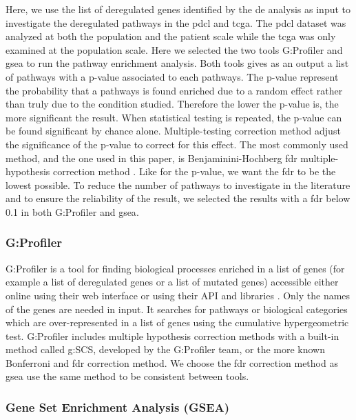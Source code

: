 Here, we use the list of deregulated genes identified by the \acrlong{de} analysis as input to investigate the deregulated pathways in the \acrshort{pdcl} and \acrshort{tcga}.
The \acrlong{pdcl} dataset was analyzed at both the population and the patient scale while the \acrshort{tcga} was only examined at the population scale.
Here we selected the two tools G:Profiler and \acrfull{gsea} to run the pathway enrichment analysis.
Both tools gives as an output a list of pathways with a p-value associated to each pathways.
The p-value represent the probability that a pathways is found enriched due to a random effect rather than truly due to the condition studied.
Therefore the lower the p-value is, the more significant the result.
When statistical testing is repeated, the p-value can be found significant by chance alone.
Multiple-testing correction method adjust the significance of the p-value to correct for this effect.
The most commonly used method, and the one used in this paper, is Benjaminini-Hochberg \acrfull{fdr} multiple-hypothesis correction method \cite*{Reimand2019}.
Like for the p-value, we want the \acrshort{fdr} to be the lowest possible.
To reduce the number of pathways to investigate in the literature and to ensure the reliability of the result, we selected the results with a \acrshort{fdr} below 0.1 in both G:Profiler and \acrshort{gsea}.

\subsubsection{G:Profiler}
G:Profiler is a tool for finding biological processes enriched in a list of genes (for example a list of deregulated genes or a list of mutated genes) accessible either online using their web interface or using their API and libraries \cite*{Raudvere2019}.
Only the names of the genes are needed in input.
It searches for pathways or biological categories which are over-represented in a list of genes using the cumulative hypergeometric test.
G:Profiler includes multiple hypothesis correction methods with a built-in method called g:SCS, developed by the G:Profiler team, or the more known Bonferroni and \acrshort{fdr} correction method.
We choose the \acrshort{fdr} correction method as \acrshort{gsea} use the same method to be consistent between tools.

\subsubsection{Gene Set Enrichment Analysis (GSEA)}

